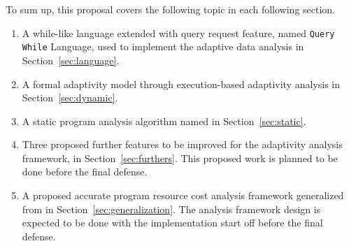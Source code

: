 To sum up, this proposal covers the following topic in each following section.
\begin{enumerate}
\item A while-like language extended with query request feature, named {\tt Query While} Language, 
used to implement 
the adaptive data analysis in Section~\ref{sec:language}.
\item A formal adaptivity model through execution-based adaptivity analysis in Section~\ref{sec:dynamic}.
\item A static program analysis algorithm named {\THESYSTEM} in Section~\ref{sec:static}.
\item Three proposed further features to be improved for the adaptivity analysis framework,
in Section~\ref{sec:furthers}.
 This proposed work is planned to be done before the final defense.
\item A proposed accurate program resource cost analysis framework generalized from {\THESYSTEM} in Section~\ref{sec:generalization}. 
The analysis framework design is expected to be done with the implementation start off before the final defense.
\end{enumerate}